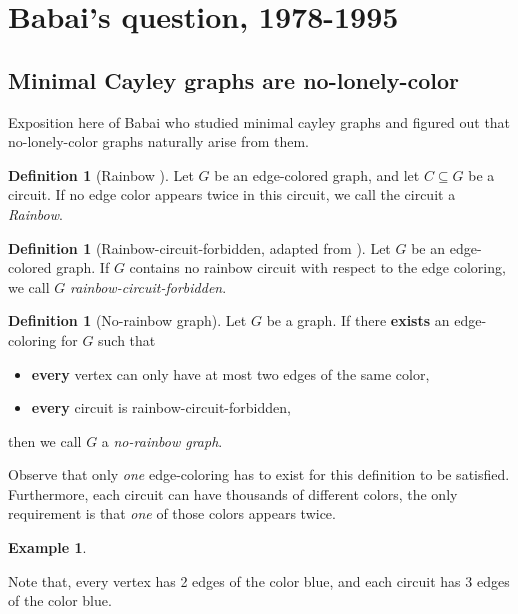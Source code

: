 \documentclass[a4paper,10pt]{article}
\numberwithin{equation}{section}
\theoremstyle{definition}
\newtheorem{definition}[theorem]{Definition}
\newtheorem*{example}{Example}
\begin{document}
\section{Babai's question, 1978-1995}
\subsection{Minimal Cayley graphs are no-lonely-color}
    Exposition here of Babai who studied minimal cayley graphs and figured out that no-lonely-color graphs naturally arise from them.
    \begin{definition}[Rainbow \cite{Hoffman2019}]
        Let \(G\) be an edge-colored graph, and let \(C\subseteq G\) be a circuit. If no edge color appears twice in this circuit, we call the circuit a \emph{Rainbow}.
    \end{definition}
    \begin{definition}[Rainbow-circuit-forbidden, adapted from \cite{Hoffman2019}]
        Let \(G\) be an edge-colored graph. If \(G\) contains no rainbow circuit with respect to the edge coloring, we call \(G\) \emph{rainbow-circuit-forbidden}.
    \end{definition}
    \begin{definition}[No-rainbow graph]\label{no-pied}
        Let \(G\) be a graph. If there \textbf{exists} an edge-coloring for \(G\) such that 
        \begin{itemize}
            \item \textbf{every} vertex can only have at most two edges of the same color,
            \item \textbf{every} circuit is rainbow-circuit-forbidden,
        \end{itemize}
        then we call \(G\) a \emph{no-rainbow graph}.
    \end{definition}
    Observe that only \emph{one} edge-coloring has to exist for this definition to be satisfied. Furthermore, each circuit can have thousands of different colors, the only requirement is that \emph{one} of those colors appears twice.
    \begin{example}\label{no-rainbow-example}
        \leavevmode\par
        \begin{center}
        \end{center}
        Note that, every vertex has 2 edges of the color blue, and each circuit has 3 edges of the color blue.
    \end{example}
\end{document}
